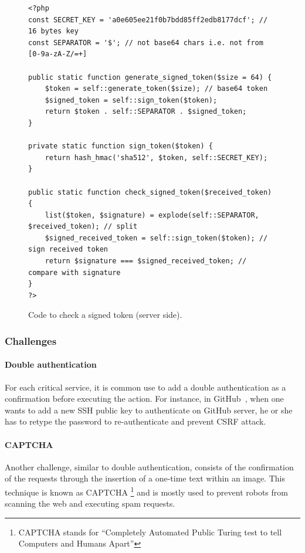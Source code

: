 \documentclass[a4paper,11pt,openany]{report}
\begin{document}
  \begin{figure}[ht!]
  \begin{verbatim}
<?php
const SECRET_KEY = 'a0e605ee21f0b7bdd85ff2edb8177dcf'; // 16 bytes key
const SEPARATOR = '$'; // not base64 chars i.e. not from [0-9a-zA-Z/=+]

public static function generate_signed_token($size = 64) {
    $token = self::generate_token($size); // base64 token
    $signed_token = self::sign_token($token);
    return $token . self::SEPARATOR . $signed_token;
}

private static function sign_token($token) {
    return hash_hmac('sha512', $token, self::SECRET_KEY);
}
  
public static function check_signed_token($received_token) {
    list($token, $signature) = explode(self::SEPARATOR, $received_token); // split
    $signed_received_token = self::sign_token($token); // sign received token
    return $signature === $signed_received_token; // compare with signature
}
?>
  \end{verbatim}
  \caption{Code to check a signed token (server side).}
  \label{figure:signed_token_server}
  \end{figure}
  
  \subsubsection{Challenges}
  
  \paragraph{Double authentication}
  For each critical service, it is common use to add a double authentication as a confirmation 
  before executing the action. For instance, in GitHub~\cite{github}, when one wants to add a new 
  SSH public key to authenticate on GitHub server, he or she has to retype the password to 
  re-authenticate and prevent CSRF attack.
  
  \paragraph{CAPTCHA}
  Another challenge, similar to double authentication, consists of the confirmation of the requests 
  through the insertion of a one-time text within an image. This technique is known as CAPTCHA
  \footnote{CAPTCHA stands for ``Completely Automated Public Turing test to tell Computers and 
  Humans Apart''} and is mostly used to prevent robots from scanning the web and executing spam 
  requests.
  
\end{document}

